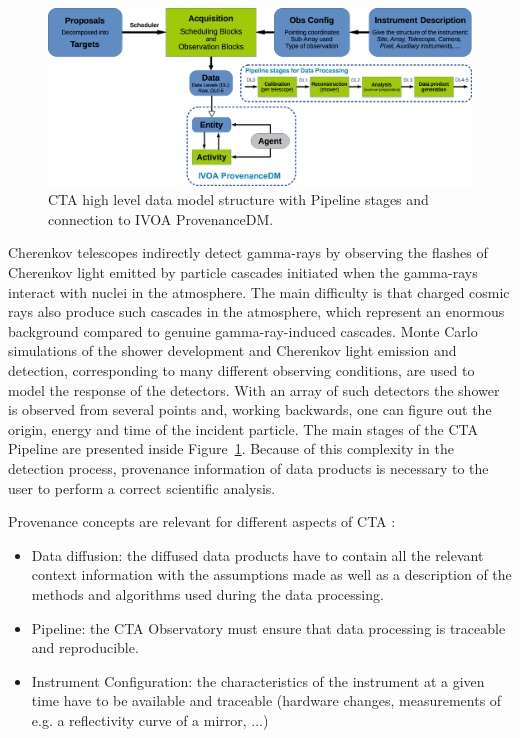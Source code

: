 \begin{figure}
\centering
\includegraphics[width=\textwidth]{CTA_DM_high_level.png}
\caption{CTA high level data model structure with Pipeline stages and connection to IVOA ProvenanceDM.}
\label{fig:cta_dm}
\end{figure}

Cherenkov telescopes indirectly detect gamma-rays by observing the flashes of Cherenkov light emitted by particle cascades initiated when the gamma-rays interact with nuclei in the atmosphere. The main difficulty  is that charged cosmic rays also produce such cascades in the atmosphere, which represent an enormous background compared to genuine gamma-ray-induced cascades. Monte Carlo simulations of the shower development and Cherenkov light emission and detection, corresponding to many different observing conditions, are used to model the response of the detectors.  With an array of such detectors the shower is observed  from several points and, working backwards, one can figure out the origin, energy and time of the incident particle. The main stages of the CTA Pipeline are presented inside Figure~\ref{fig:cta_dm}. Because of this complexity in the detection process, provenance information of data products is necessary to the user to perform a correct scientific analysis.

Provenance concepts are relevant for different aspects of CTA :
\begin{itemize}
\item Data diffusion: the diffused data products have to contain all the relevant context information with the assumptions made as well as a description of the methods and algorithms used during the data processing.
\item Pipeline: the CTA Observatory must ensure that data processing is traceable and reproducible.
\item Instrument Configuration: the characteristics of the instrument at a given time have to be available and traceable (hardware changes, measurements of e.g. a reflectivity curve of a mirror, ...)
\end{itemize}

